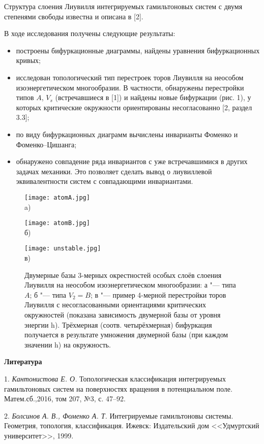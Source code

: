 Структура слоения Лиувилля интегрируемых гамильтоновых систем с двумя степенями свободы известна и описана в [2].

В ходе исследования получены следующие результаты:
\begin{itemize}
	\item построены бифуркационные диаграммы, найдены уравнения бифуркационных кривых;
	\item исследован топологический тип перестроек торов Лиувилля на неособом изоэнергетическом многообразии. В частности, обнаружены перестройки типов $A$, $V_s$ (встречавшиеся в [1]) и найдены новые бифуркации (рис. 1), у которых критические окружности ориентированы несогласованно [2, раздел 3.3];
	\item по виду бифуркационных диаграмм вычислены инварианты Фоменко и Фоменко--Цишанга;
	\item обнаружено совпадение ряда инвариантов с уже встречавшимися в других задачах механики. Это позволяет сделать вывод о лиувиллевой эквивалентности систем с совпадающими инвариантами.
\end{itemize}
\begin{figure}
\begin{minipage}{0.33\linewidth}
\begin{center}
\texttt{[image: atomA.jpg]} \\ a)
\end{center}
\end{minipage}
\hfill
\begin{minipage}{0.33\linewidth}
\begin{center}
\texttt{[image: atomB.jpg]} \\ б)
\end{center}
\end{minipage}
\hfill
\begin{minipage}{0.98\linewidth}
\begin{center}
\texttt{[image: unstable.jpg]} \\ в)
\end{center}
\end{minipage}
\caption{\small{Двумерные базы 3-мерных окрестностей особых слоёв слоения Лиувилля на неособом изоэнергетическом многообразии: а "--- типа $A$; б "--- типа $V_2=B$; в "--- пример 4-мерной перестройки торов Лиувилля с несогласованными ориентациями критических окружностей (показана зависимость двумерной базы от уровня энергии h). Трёхмерная (соотв. четырёхмерная) бифуркация получается в результате умножения двумерной базы (при каждом значении h) на окружность.}}
\end{figure}

\smallskip \centerline {\bf Литература} \nopagebreak

1. {\it Кантонистова Е. О.} Топологическая классификация интегрируемых гамильтоновых систем на поверхностях вращения в потенциальном поле.
Матем.сб.,2016, том 207, №3, с. 47--92.

2. {\it Болсинов А. В., Фоменко А. Т.} Интегрируемые гамильтоновы системы. Геометрия, топология, классификация. Ижевск: Издательский дом <<Удмуртский университет>>, 1999.
